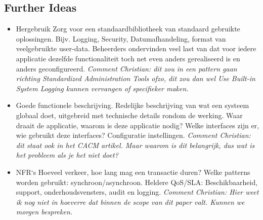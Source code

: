 \subsection*{Further Ideas} 
\begin{itemize}
	\item Hergebruik Zorg voor een standaardbibliotheek van standaard gebruikte oplossingen. Bijv. Logging, Security, Datumafhandeling, format van veelgebruikte user-data. Beheerders ondervinden veel last van dat voor iedere applicatie dezelfde functionaliteit toch net even anders gerealiseerd is en anders geconfigureerd. \textit{Comment Christian: dit zou in een pattern gaan richting {\sc Standardized Administration Tools} ofzo, dit zou dan wel {\sc Use Built-in System Logging} kunnen vervangen of specifieker maken.} 
	\item Goede functionele beschrijving. Redelijke beschrijving van wat een systeem globaal doet, uitgebreid met technische details rondom de werking. Waar draait de applicatie, waarom is deze applicatie nodig? Welke interfaces zijn er, wie gebruikt deze interfaces? Configuratie instellingen. \textit{Comment Christian: dit staat ook in het CACM artikel. Maar waarom is dit belangrijk, dus wat is het probleem als je het niet doet?} 
	\item NFR`s Hoeveel verkeer, hoe lang mag een transactie duren? Welke patterns worden gebruikt: synchroon/asynchroon. Heldere QoS/SLA: Beschikbaarheid, support, onderhoudsvensters, audit en logging. \textit{Comment Christian: Hier weet ik nog niet in hoeverre dat binnen de scope van dit paper valt. Kunnen we morgen bespreken.} 
\end{itemize}
